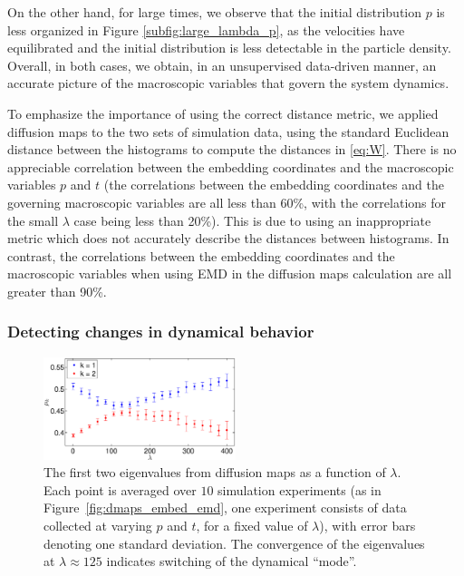 \documentclass[preprint]{elsarticle}
\begin{document}
%
On the other hand, for large times, we observe that the initial distribution $p$ is less organized in Figure \ref{subfig:large_lambda_p}, as the velocities have equilibrated and the initial distribution is less detectable in the particle density.
%
Overall, in both cases, we obtain, in an unsupervised data-driven manner, an accurate picture of the macroscopic variables that govern the system dynamics.


To emphasize the importance of using the correct distance metric, we applied diffusion maps to the two sets of simulation data, using the standard Euclidean distance between the histograms to compute the distances in \eqref{eq:W}.
%
There is no appreciable correlation between the embedding coordinates and the macroscopic variables $p$ and $t$ (the correlations between the embedding coordinates and the governing macroscopic variables are all  less than 60\%, with the correlations for the small $\lambda$ case being less than 20\%). 
%
This is due to using an inappropriate metric which does not accurately describe the distances between histograms.
%
In contrast, the correlations between the embedding coordinates and the macroscopic variables when using EMD in the diffusion maps calculation are all greater than 90\%.





\subsubsection{Detecting changes in dynamical behavior}


\begin{figure}[t] 
\centering
\includegraphics[width=0.5\textwidth]{detect_change_eigenvalues}
\caption{The first two eigenvalues from diffusion maps as a function of $\lambda$. Each point is averaged over $10$ simulation experiments (as in Figure~\ref{fig:dmaps_embed_emd}, one experiment consists of data collected at varying $p$ and $t$, for a fixed value of $\lambda$), with error bars denoting one standard deviation. 
The convergence of the eigenvalues at $\lambda \approx 125$ indicates switching of the dynamical ``mode''.}
\label{fig:detect_change}
\end{figure}
\end{document}
